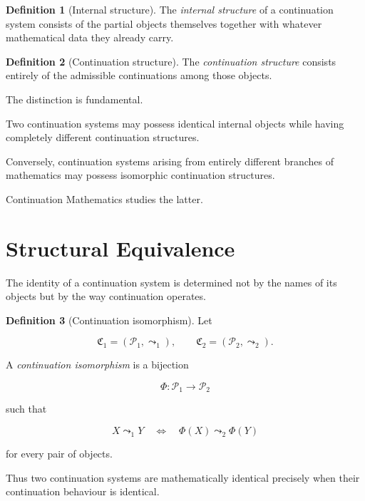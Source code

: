 \documentclass[13pt,openany]{book}
\theoremstyle{plain}
\theoremstyle{definition}
\newtheorem{definition}{Definition}[chapter]
\begin{document}
\begin{definition}[Internal structure]
The \emph{internal structure} of a continuation system consists of the
partial objects themselves together with whatever mathematical data they
already carry.
\end{definition}

\begin{definition}[Continuation structure]
The \emph{continuation structure} consists entirely of the admissible
continuations among those objects.
\end{definition}

The distinction is fundamental.

Two continuation systems may possess identical internal objects while
having completely different continuation structures.

Conversely, continuation systems arising from entirely different branches
of mathematics may possess isomorphic continuation structures.

Continuation Mathematics studies the latter.

\section{Structural Equivalence}

The identity of a continuation system is determined not by the names of
its objects but by the way continuation operates.

\begin{definition}[Continuation isomorphism]
Let

\[
\mathfrak C_1=(\mathcal P_1,\leadsto_1),
\qquad
\mathfrak C_2=(\mathcal P_2,\leadsto_2).
\]

A \emph{continuation isomorphism} is a bijection

\[
\Phi:\mathcal P_1\longrightarrow\mathcal P_2
\]

such that

\[
X\leadsto_1Y
\quad\Longleftrightarrow\quad
\Phi(X)\leadsto_2\Phi(Y)
\]

for every pair of objects.
\end{definition}

Thus two continuation systems are mathematically identical precisely when
their continuation behaviour is identical.

\end{document}

